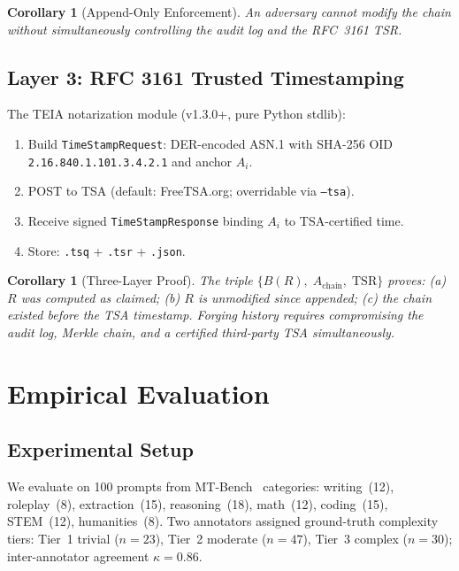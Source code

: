 \documentclass[11pt,a4paper]{article}
\newtheorem{corollary}[theorem]{Corollary}
\newcommand{\teia}{\textsc{TEIA}}
\begin{document}
\begin{corollary}[Append-Only Enforcement]
An adversary cannot modify the chain without simultaneously controlling the audit
log and the RFC~3161 TSR.
\end{corollary}

\subsection{Layer 3: RFC 3161 Trusted Timestamping}

The \teia{} notarization module (v1.3.0+, pure Python stdlib):
\begin{enumerate}
  \item Build \texttt{TimeStampRequest}: DER-encoded ASN.1 with SHA-256 OID
        \texttt{2.16.840.1.101.3.4.2.1} and anchor $A_i$.
  \item POST to TSA (default: FreeTSA.org; overridable via \texttt{--tsa}).
  \item Receive signed \texttt{TimeStampResponse} binding $A_i$ to TSA-certified time.
  \item Store: \texttt{.tsq} + \texttt{.tsr} + \texttt{.json}.
\end{enumerate}

\begin{corollary}[Three-Layer Proof]
The triple $\{B(R),\; A_{\mathrm{chain}},\; \mathrm{TSR}\}$ proves: (a) $R$ was
computed as claimed; (b) $R$ is unmodified since appended; (c) the chain existed
before the TSA timestamp. Forging history requires compromising the audit log,
Merkle chain, and a certified third-party TSA simultaneously.
\end{corollary}

\section{Empirical Evaluation}
\label{sec:eval}

\subsection{Experimental Setup}

We evaluate on 100 prompts from MT-Bench~\cite{mtbench} categories: writing~(12),
roleplay~(8), extraction~(15), reasoning~(18), math~(12), coding~(15),
STEM~(12), humanities~(8). Two annotators assigned ground-truth complexity tiers:
Tier~1 trivial ($n=23$), Tier~2 moderate ($n=47$), Tier~3 complex ($n=30$);
inter-annotator agreement $\kappa = 0.86$.
\end{document}
